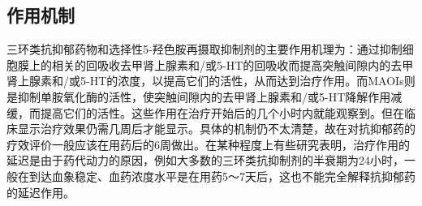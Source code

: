 \subsection{作用机制}

三环类抗抑郁药物和选择性5-羟色胺再摄取抑制剂的主要作用机理为：通过抑制细胞膜上的相关的回吸收去甲肾上腺素和/或5-HT的回吸收而提高突触间隙内的去甲肾上腺素和/或5-HT的浓度，以提高它们的活性，从而达到治疗作用。而MAOIs则是抑制单胺氧化酶的活性，使突触间隙内的去甲肾上腺素和/或5-HT降解作用减缓，而提高它们的活性。这些作用在治疗开始后的几个小时内就能观察到。但在临床显示治疗效果仍需几周后才能显示。具体的机制仍不太清楚，故在对抗抑郁药的疗效评价一般应该在用药后的6周做出。在某种程度上有些研究表明，治疗作用的延迟是由于药代动力的原因，例如大多数的三环类抗抑制剂的半衰期为24小时，一般在到达血象稳定、血药浓度水平是在用药5～7天后，这也不能完全解释抗抑郁药的延迟作用。


